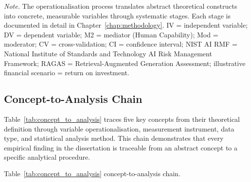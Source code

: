 \vspace{0.5em}
\noindent\textit{Note.} The operationalisation process translates abstract theoretical constructs into concrete, measurable variables through systematic stages. Each stage is documented in detail in Chapter~\ref{chap:methodology}. IV = independent variable; DV = dependent variable; M2 = mediator (Human Capability); Mod = moderator; CV = cross-validation; CI = confidence interval; NIST AI RMF = National Institute of Standards and Technology AI Risk Management Framework; RAGAS = Retrieval-Augmented Generation Assessment; illustrative financial scenario = return on investment.

\subsection{Concept-to-Analysis Chain}

Table~\ref{tab:concept_to_analysis} traces five key concepts from their theoretical definition through variable operationalisation, measurement instrument, data type, and statistical analysis method. This chain demonstrates that every empirical finding in the dissertation is traceable from an abstract concept to a specific analytical procedure.


\noindent Table~\ref{tab:concept_to_analysis} concept-to-analysis chain.

